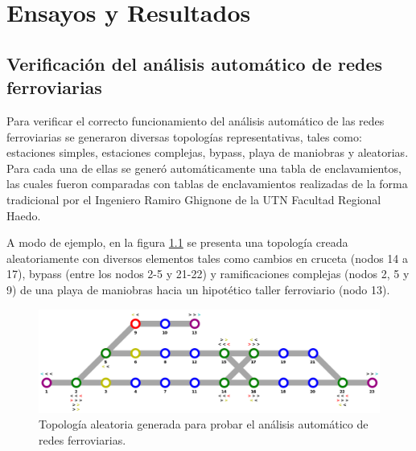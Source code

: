 
\chapter{Ensayos y Resultados} %

\label{Chapter4} %




\section{Verificación del análisis automático de redes ferroviarias}
	
	Para verificar el correcto funcionamiento del análisis automático de las redes ferroviarias se generaron diversas topologías representativas, tales como: estaciones simples, estaciones complejas, bypass, playa de maniobras y aleatorias. Para cada una de ellas se generó automáticamente una tabla de enclavamientos, las cuales fueron comparadas con tablas de enclavamientos realizadas de la forma tradicional por el Ingeniero Ramiro Ghignone de la UTN Facultad Regional Haedo.
	
	A modo de ejemplo, en la figura \ref{fig:Mapa_0} se presenta una topología creada aleatoriamente con diversos elementos tales como cambios en cruceta (nodos 14 a 17), bypass (entre los nodos 2-5 y 21-22) y ramificaciones complejas (nodos 2, 5 y 9) de una playa de maniobras hacia un hipotético taller ferroviario (nodo 13).
	
	\begin{figure}[h]
	\centering
	\includegraphics[scale=0.45]{./Figures/Mapa_0}
		\caption{Topología aleatoria generada para probar el análisis automático de redes ferroviarias.}
		\label{fig:Mapa_0}
	\end{figure}
	
